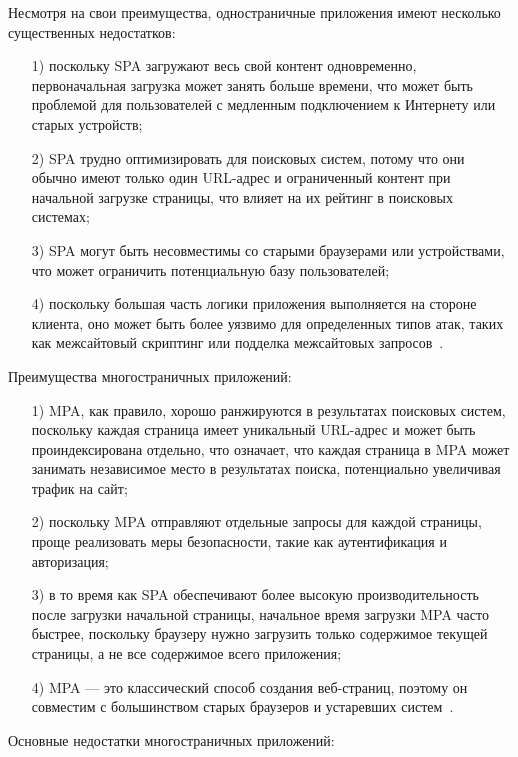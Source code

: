 \documentclass{bmstu}
\begin{document}
Несмотря на свои преимущества, одностраничные приложения имеют несколько существенных недостатков:

\begin{enumerate}
\item[1)] поскольку SPA загружают весь свой контент одновременно, первоначальная загрузка может занять больше времени, что может быть проблемой для пользователей с медленным подключением к Интернету или старых устройств;
\item[2)] SPA трудно оптимизировать для поисковых систем, потому что они обычно имеют только один URL-адрес и ограниченный контент при начальной загрузке страницы, что влияет на их рейтинг в поисковых системах;
\item[3)] SPA могут быть несовместимы со старыми браузерами или устройствами, что может ограничить потенциальную базу пользователей;
\item[4)] поскольку большая часть логики приложения выполняется на стороне клиента, оно может быть более уязвимо для определенных типов атак, таких как межсайтовый скриптинг или подделка межсайтовых запросов~\cite{Davidson2023}.
\end{enumerate}

Преимущества многостраничных приложений:

\begin{enumerate}
\item[1)] MPA, как правило, хорошо ранжируются в результатах поисковых систем, поскольку каждая страница имеет уникальный URL-адрес и может быть проиндексирована отдельно, что означает, что каждая страница в MPA может занимать независимое место в результатах поиска, потенциально увеличивая трафик на сайт;
\item[2)] поскольку MPA отправляют отдельные запросы для каждой страницы, проще реализовать меры безопасности, такие как аутентификация и авторизация;
\item[3)] в то время как SPA обеспечивают более высокую производительность после загрузки начальной страницы, начальное время загрузки MPA часто быстрее, поскольку браузеру нужно загрузить только содержимое текущей страницы, а не все содержимое всего приложения;
\item[4)] MPA --- это классический способ создания веб-страниц, поэтому он совместим с большинством старых браузеров и устаревших систем~\cite{Davidson2023}.
\end{enumerate}

Основные недостатки многостраничных приложений:
\end{document}
